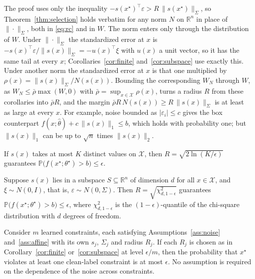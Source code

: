 \begin{remark}\label{rem:norm}
The proof uses only the inequality
$-s(x^\star)^\top\varepsilon > R\,\|s(x^\star)\|_\Sigma$, so
Theorem~\ref{thm:selection} holds verbatim for any norm $N$ on $\mathbb{R}^n$
in place of $\|\cdot\|_\Sigma$, both in \eqref{eq:rc} and in $W$. The norm
enters only through the distribution of $W$. Under $\|\cdot\|_\Sigma$ the
standardized error at $x$ is
$-s(x)^\top\varepsilon/\|s(x)\|_\Sigma = -u(x)^\top\xi$ with $u(x)$ a unit
vector, so it has the same tail at every $x$; Corollaries~\ref{cor:finite}
and~\ref{cor:subspace} use exactly this. Under another norm the standardized
error at $x$ is that one multiplied by
$\rho(x) = \|s(x)\|_\Sigma / N(s(x))$. Bounding the corresponding $W_N$
through $W$, as $W_N \le \bar\rho\max(W,0)$ with
$\bar\rho = \sup_{x\in\mathcal{X}} \rho(x)$, turns a radius $R$ from these
corollaries into $\bar\rho R$, and the margin
$\bar\rho R\,N(s(x)) \ge R\,\|s(x)\|_\Sigma$ is at least as large at every
$x$. For example, noise bounded as $|\varepsilon_i| \le c$ gives the box
counterpart $f(x;\hat\theta) + c\,\|s(x)\|_1 \le b$, which holds with
probability one; but $\|s(x)\|_1$ can be up to $\sqrt{n}$ times
$\|s(x)\|_2$.
\end{remark}

\begin{corollary}\label{cor:finite}
If $s(x)$ takes at most $K$ distinct values on $\mathcal{X}$, then
$R = \sqrt{2\ln(K/\epsilon)}$ guarantees
$\mathbb{P}\bigl(f(x^\star;\theta^\star) > b\bigr) \le \epsilon$.
\end{corollary}

\begin{corollary}\label{cor:subspace}
Suppose $s(x)$ lies in a subspace $S \subseteq \mathbb{R}^n$ of dimension $d$
for all $x \in \mathcal{X}$, and $\xi \sim N(0, I)$, that is,
$\varepsilon \sim N(0,\Sigma)$. Then $R = \sqrt{\chi^2_{d,1-\epsilon}}$
guarantees $\mathbb{P}\bigl(f(x^\star;\theta^\star) > b\bigr) \le \epsilon$,
where $\chi^2_{d,1-\epsilon}$ is the $(1-\epsilon)$-quantile of the chi-square
distribution with $d$ degrees of freedom.
\end{corollary}

\begin{corollary}\label{cor:multi}
Consider $m$ learned constraints, each satisfying
Assumptions~\ref{ass:noise} and~\ref{ass:affine} with its own $s_j$,
$\Sigma_j$ and radius $R_j$. If each $R_j$ is chosen as in
Corollary~\ref{cor:finite} or~\ref{cor:subspace} at level $\epsilon/m$, then
the probability that $x^\star$ violates at least one clean-label constraint is
at most $\epsilon$. No assumption is required on the dependence of the noise
across constraints.
\end{corollary}

